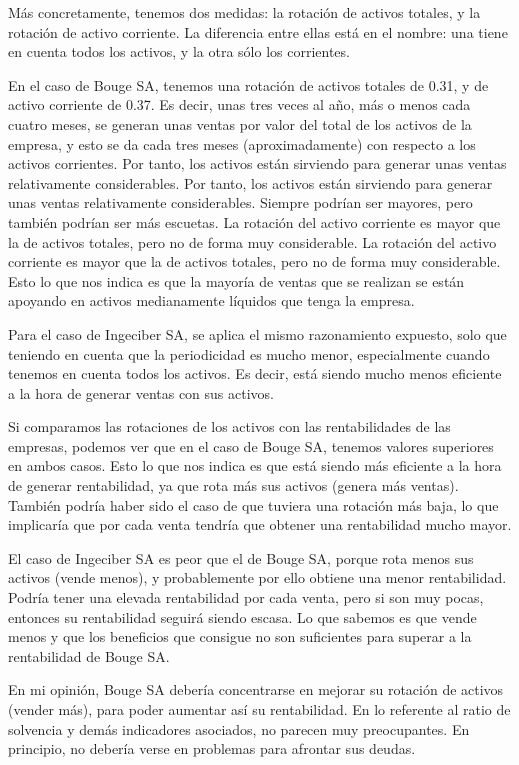 \documentclass[a4paper]{article}
\begin{document}
Más concretamente, tenemos dos medidas: la rotación de activos totales, y la rotación de activo corriente. La diferencia entre ellas está en el nombre: una tiene en cuenta todos los activos, y la otra sólo los corrientes.

En el caso de Bouge SA, tenemos una rotación de activos totales de 0.31, y de activo corriente de 0.37. Es decir, unas tres veces al año, más o menos cada cuatro meses, se generan unas ventas por valor del total de los activos de la empresa, y esto se da cada tres meses (aproximadamente) con respecto a los activos corrientes. Por tanto, los activos están sirviendo para generar unas ventas relativamente considerables. Por tanto, los activos están sirviendo para generar unas ventas relativamente considerables. Siempre podrían ser mayores, pero también podrían ser más escuetas. La rotación del activo corriente es mayor que la de activos totales, pero no de forma muy considerable. La rotación del activo corriente es mayor que la de activos totales, pero no de forma muy considerable. Esto lo que nos indica es que la mayoría de ventas que se realizan se están apoyando en activos medianamente líquidos que tenga la empresa.

Para el caso de Ingeciber SA, se aplica el mismo razonamiento expuesto, solo que teniendo en cuenta que la periodicidad es mucho menor, especialmente cuando tenemos en cuenta todos los activos. Es decir, está siendo mucho menos eficiente a la hora de generar ventas con sus activos.

Si comparamos las rotaciones de los activos con las rentabilidades de las empresas, podemos ver que en el caso de Bouge SA, tenemos valores superiores en ambos casos. Esto lo que nos indica es que está siendo más eficiente a la hora de generar rentabilidad, ya que rota más sus activos (genera más ventas). También podría haber sido el caso de que tuviera una rotación más baja, lo que implicaría que por cada venta tendría que obtener una rentabilidad mucho mayor.

El caso de Ingeciber SA es peor que el de Bouge SA, porque rota menos sus activos (vende menos), y probablemente por ello obtiene una menor rentabilidad. Podría tener una elevada rentabilidad por cada venta, pero si son muy pocas, entonces su rentabilidad seguirá siendo escasa. Lo que sabemos es que vende menos y que los beneficios que consigue no son suficientes para superar a la rentabilidad de Bouge SA.

En mi opinión, Bouge SA debería concentrarse en mejorar su rotación de activos (vender más), para poder aumentar así su rentabilidad. En lo referente al ratio de solvencia y demás indicadores asociados, no parecen muy preocupantes. En principio, no debería verse en problemas para afrontar sus deudas.
\end{document}
